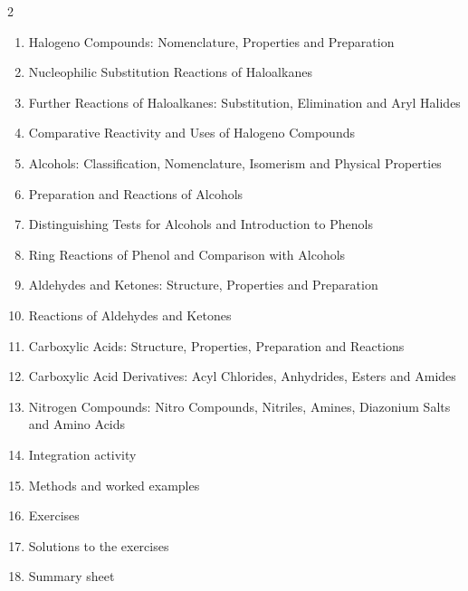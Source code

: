 \documentclass[11pt]{article}
\begin{document}
\begin{sommaire}
\begin{multicols}{2}
\begin{enumerate}
\item Halogeno Compounds: Nomenclature, Properties and Preparation
\item Nucleophilic Substitution Reactions of Haloalkanes
\item Further Reactions of Haloalkanes: Substitution, Elimination and Aryl Halides
\item Comparative Reactivity and Uses of Halogeno Compounds
\item Alcohols: Classification, Nomenclature, Isomerism and Physical Properties
\item Preparation and Reactions of Alcohols
\item Distinguishing Tests for Alcohols and Introduction to Phenols
\item Ring Reactions of Phenol and Comparison with Alcohols
\item Aldehydes and Ketones: Structure, Properties and Preparation
\item Reactions of Aldehydes and Ketones
\item Carboxylic Acids: Structure, Properties, Preparation and Reactions
\item Carboxylic Acid Derivatives: Acyl Chlorides, Anhydrides, Esters and Amides
\item Nitrogen Compounds: Nitro Compounds, Nitriles, Amines, Diazonium Salts and Amino Acids
\item Integration activity
\item Methods and worked examples
\item Exercises
\item Solutions to the exercises
\item Summary sheet
\end{enumerate}
\end{multicols}
\end{sommaire}
\end{document}
